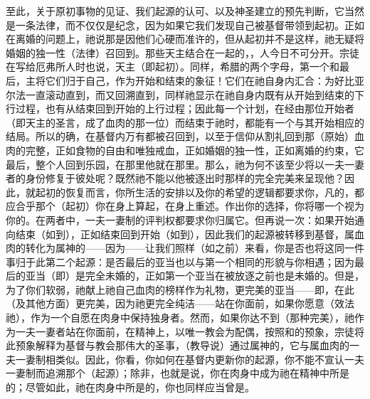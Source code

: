 至此，关于原初事物的见证、我们起源的认可、以及神圣建立的预先判断，它当然是一条法律，而不仅仅是纪念，因为如果它我们发现自己被基督带领到起初。正如在离婚的问题上，祂说那是因他们心硬而准许的，但从起初并不是这样，祂无疑将婚姻的独一性（法律）召回到。那些天主结合在一起的，，人今日不可分开。宗徒在写给厄弗所人时也说，天主（即起初）。同样，希腊的两个字母，第一个和最后，主将它们归于自己，作为开始和结束的象征！它们在祂自身内汇合：为好比亚尔法一直滚动直到，而又回溯直到，同样祂显示在祂自身内既有从开始到结束的下行过程，也有从结束回到开始的上行过程；因此每一个计划，在经由那位开始者（即天主的圣言，成了血肉的那一位）而结束于祂时，都能有一个与其开始相应的结局。所以的确，在基督内万有都被召回到，以至于信仰从割礼回到那（原始）血肉的完整，正如食物的自由和唯独戒血，正如婚姻的独一性，正如离婚的约束，它最后，整个人回到乐园，在那里他就在那里。那么，祂为何不该至少将以一夫一妻者的身份修复于彼处呢？既然祂不能以他被逐出时那样的完全完美来呈现他？因此，就起初的恢复而言，你所生活的安排以及你的希望的逻辑都要求你，凡的，都应合乎那个（起初）你在身上算起，在身上重述。作出你的选择，你将哪一个视为你的。在两者中，一夫一妻制的评判权都要求你归属它。但再说一次：如果开始通向结束（如到），正如结束回到开始（如到），因此我们的起源被转移到基督，属血肉的转化为属神的——因为——让我们照样（如之前）来看，你是否也将这同一件事归于此第二个起源：是否最后的亚当也以与第一个相同的形貌与你相遇；因为最后的亚当（即）是完全未婚的，正如第一个亚当在被放逐之前也是未婚的。但是，为了你们软弱，祂献上祂自己血肉的榜样作为礼物，更完美的亚当——即，在此（及其他方面）更完美，因为祂更完全纯洁——站在你面前，如果你愿意（效法祂），作为一个自愿在肉身中保持独身者。然而，如果你达不到（那种完美），祂作为一夫一妻者站在你面前，在精神上，以唯一教会为配偶，按照和的预象，宗徒将此预象解释为基督与教会那伟大的圣事，（教导说）通过属神的，它与属血肉的一夫一妻制相类似。因此，你看，你如何在基督内更新你的起源，你不能不宣认一夫一妻制而追溯那个（起源）；除非，也就是说，你在肉身中成为祂在精神中所是的；尽管如此，祂在肉身中所是的，你也同样应当曾是。\par

